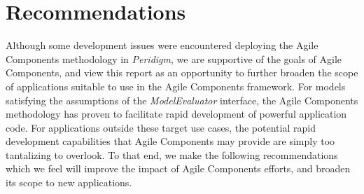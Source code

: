 \documentclass[10pt]{article}
\theoremstyle{plain}
\theoremstyle{definition}
\theoremstyle{remark}
\numberwithin{equation}{section}
\begin{document}
\section{Recommendations} \label{sec:recommendations}
Although some development issues were encountered deploying the Agile Components methodology in \emph{Peridigm}, we are supportive of the goals of Agile Components, and view this report as an opportunity to further broaden the scope of applications suitable to use in the Agile Components framework. For models satisfying the assumptions of the \emph{ModelEvaluator} interface, the Agile Components methodology has proven to facilitate rapid development of powerful application code. For applications outside these target use cases, the potential rapid development capabilities that Agile Components may provide are simply too tantalizing to overlook. To that end, we make the following recommendations which we feel will improve the impact of Agile Components efforts, and broaden its scope to new applications.
\end{document}
